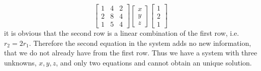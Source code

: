 \begin{enumerate}[label=(\alph*)]
\begin{equation}
\begin{bmatrix}
                1   & 4     &       2   \\
                2   & 8     &       4   \\
                1   & 5     &       4   
            \end{bmatrix}
            \begin{bmatrix}
                x   \\
                y   \\
                z
            \end{bmatrix}
            \begin{bmatrix}
                1   \\
                2   \\
                1
            \end{bmatrix}
        \end{equation}
        it is obvious that the second row is a linear
        combination of the first row, i.e. $r_{2}=2r_{1}$. Therefore the
        second equation in the system adds no new information, that we do
        not already have from the first row. Thus we have a system with
        three unknowns, $x,y,z$, and only two equations and cannot
        obtain an unique solution.    
    

\end{enumerate}
